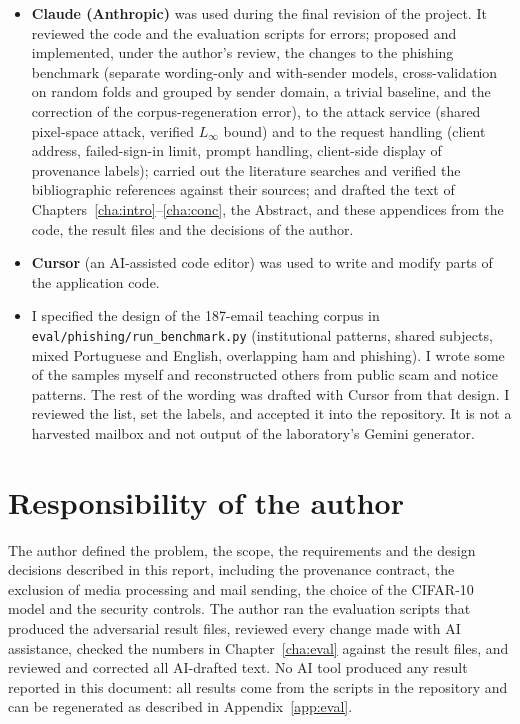 \begin{itemize}
\item \textbf{Claude (Anthropic)} was used during the final revision of the project. It reviewed the code and the evaluation scripts for errors; proposed and implemented, under the author's review, the changes to the phishing benchmark (separate wording-only and with-sender models, cross-validation on random folds and grouped by sender domain, a trivial baseline, and the correction of the corpus-regeneration error), to the attack service (shared pixel-space attack, verified $L_\infty$ bound) and to the request handling (client address, failed-sign-in limit, prompt handling, client-side display of provenance labels); carried out the literature searches and verified the bibliographic references against their sources; and drafted the text of Chapters~\ref{cha:intro}--\ref{cha:conc}, the Abstract, and these appendices from the code, the result files and the decisions of the author.
\item \textbf{Cursor} (an AI-assisted code editor) was used to write and modify parts of the application code.
\item I specified the design of the 187-email teaching corpus in \texttt{eval/phishing/run\_benchmark.py} (institutional patterns, shared subjects, mixed Portuguese and English, overlapping ham and phishing). I wrote some of the samples myself and reconstructed others from public scam and notice patterns. The rest of the wording was drafted with Cursor from that design. I reviewed the list, set the labels, and accepted it into the repository. It is not a harvested mailbox and not output of the laboratory's Gemini generator.
\end{itemize}

\section{Responsibility of the author}
\label{sec:ai-author}

The author defined the problem, the scope, the requirements and the design decisions described in this report, including the provenance contract, the exclusion of media processing and mail sending, the choice of the CIFAR-10 model and the security controls. The author ran the evaluation scripts that produced the adversarial result files, reviewed every change made with AI assistance, checked the numbers in Chapter~\ref{cha:eval} against the result files, and reviewed and corrected all AI-drafted text. No AI tool produced any result reported in this document: all results come from the scripts in the repository and can be regenerated as described in Appendix~\ref{app:eval}.

